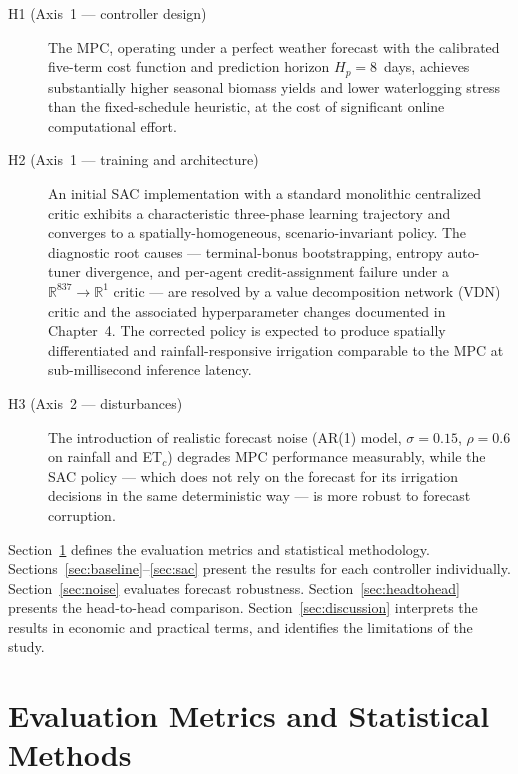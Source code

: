 \begin{description}
  \item[H1 (Axis~1 — controller design)] The MPC, operating under a perfect weather
        forecast with the calibrated five-term cost function and prediction horizon
        $H_p = 8$~days, achieves substantially higher seasonal biomass yields and lower
        waterlogging stress than the fixed-schedule heuristic, at the cost of significant
        online computational effort.

  \item[H2 (Axis~1 — training and architecture)] An initial SAC implementation with a
        standard monolithic centralized critic exhibits a characteristic three-phase
        learning trajectory and converges to a spatially-homogeneous, scenario-invariant
        policy. The diagnostic root causes — terminal-bonus bootstrapping, entropy
        auto-tuner divergence, and per-agent credit-assignment failure under a
        $\mathbb{R}^{837} \to \mathbb{R}^1$ critic — are resolved by a value
        decomposition network (VDN) critic and the associated hyperparameter changes
        documented in Chapter~4. The corrected policy is expected to produce
        spatially differentiated and rainfall-responsive irrigation comparable to
        the MPC at sub-millisecond inference latency.

  \item[H3 (Axis~2 — disturbances)] The introduction of realistic forecast noise
        (AR(1) model, $\sigma = 0.15$, $\rho = 0.6$ on rainfall and ET$_c$) degrades
        MPC performance measurably, while the SAC policy — which does not rely on the
        forecast for its irrigation decisions in the same deterministic way — is more
        robust to forecast corruption.
\end{description}

Section~\ref{sec:metrics} defines the evaluation metrics and statistical methodology.
Sections~\ref{sec:baseline}--\ref{sec:sac} present the results for each controller
individually. Section~\ref{sec:noise} evaluates forecast robustness.
Section~\ref{sec:headtohead} presents the head-to-head comparison.
Section~\ref{sec:discussion} interprets the results in economic and practical terms,
and identifies the limitations of the study.

\section{Evaluation Metrics and Statistical Methods}
\label{sec:metrics}

